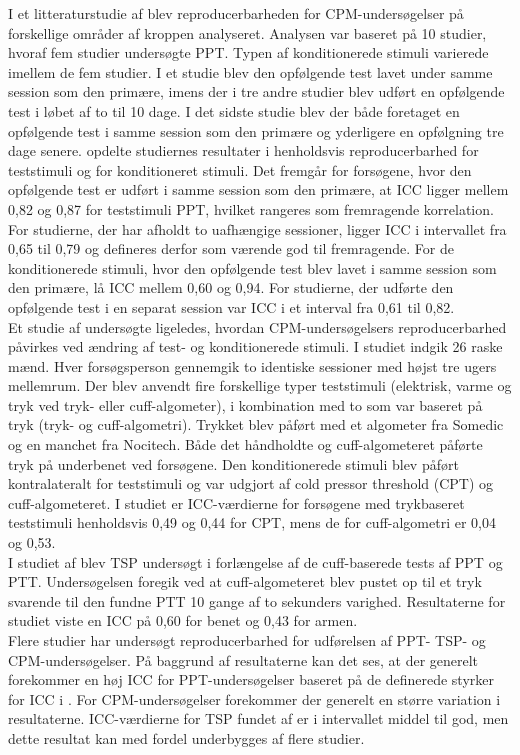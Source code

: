 I et litteraturstudie af  blev reproducerbarheden for CPM-undersøgelser på forskellige områder af kroppen analyseret. Analysen var baseret på 10 studier, hvoraf fem studier undersøgte PPT. Typen af konditionerede stimuli varierede imellem de fem studier. I et studie blev den opfølgende test lavet under samme session som den primære, imens der i tre andre studier blev udført en opfølgende test i løbet af to til 10 dage. I det sidste studie blev der både foretaget en opfølgende test i samme session som den primære og yderligere en opfølgning tre dage senere.  opdelte studiernes resultater i henholdsvis reproducerbarhed for teststimuli og for konditioneret stimuli. Det fremgår for forsøgene, hvor den opfølgende test er udført i samme session som den primære, at ICC ligger mellem 0,82 og 0,87 for teststimuli PPT, hvilket rangeres som fremragende korrelation. For studierne, der har afholdt to uafhængige sessioner, ligger ICC i intervallet fra 0,65 til 0,79 og defineres derfor som værende god til fremragende. For de konditionerede stimuli, hvor den opfølgende test blev lavet i samme session som den primære, lå ICC mellem 0,60 og 0,94. For studierne, der udførte den opfølgende test i en separat session var ICC i et interval fra 0,61 til 0,82. \citep{Kennedy2016} \\ 
Et studie af  undersøgte ligeledes, hvordan CPM-undersøgelsers reproducerbarhed påvirkes ved ændring af test- og konditionerede stimuli. I studiet indgik 26 raske mænd. Hver forsøgsperson gennemgik to identiske sessioner med højst tre ugers mellemrum. Der blev anvendt fire forskellige typer teststimuli (elektrisk, varme og tryk ved tryk- eller cuff-algometer), i kombination med to som var baseret på tryk (tryk- og cuff-algometri). Trykket blev påført med et algometer fra Somedic og en manchet fra Nocitech. Både det håndholdte og cuff-algometeret påførte tryk på underbenet ved forsøgene. Den konditionerede stimuli blev påført kontralateralt for teststimuli og var udgjort af cold pressor threshold (CPT) og cuff-algometeret. I studiet er ICC-værdierne for forsøgene med trykbaseret teststimuli henholdsvis 0,49 og 0,44 for CPT, mens de for cuff-algometri er 0,04 og 0,53. \citep{Imai2016 }\\ 
I studiet af  blev TSP undersøgt i forlængelse af de cuff-baserede tests af PPT og PTT. Undersøgelsen foregik ved at cuff-algometeret blev pustet op til et tryk svarende til den fundne PTT 10 gange af to sekunders varighed. Resultaterne for studiet viste en ICC på 0,60 for benet og 0,43 for armen. \citep{Nielsen2015} \\
Flere studier har undersøgt reproducerbarhed for udførelsen af PPT- TSP- og CPM-undersøgelser. På baggrund af resultaterne kan det ses, at der generelt forekommer en høj ICC for PPT-undersøgelser baseret på de definerede styrker for ICC i . For CPM-undersøgelser forekommer der generelt en større variation i resultaterne. ICC-værdierne for TSP fundet af  er i intervallet middel til god, men dette resultat kan med fordel underbygges af flere studier.

